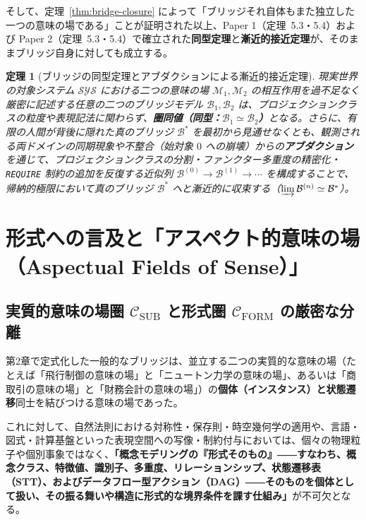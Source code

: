 \documentclass[11pt,a4paper]{ltjsarticle}
\theoremstyle{definition}
\theoremstyle{plain}
\newtheorem{theorem}{定理}[section]
\theoremstyle{remark}
\newcommand{\CFORM}{\mathcal{C}_{\mathrm{FORM}}}
\newcommand{\CSUB}{\mathcal{C}_{\mathrm{SUB}}}
\begin{document}
そして、定理~\ref{thm:bridge-closure} によって「ブリッジそれ自体もまた独立した一つの意味の場である」ことが証明された以上、Paper 1（定理~5.3・5.4）および Paper 2（定理~5.3・5.4）で確立された\textbf{同型定理}と\textbf{漸近的接近定理}が、そのままブリッジ自身に対しても成立する。

\begin{theorem}[ブリッジの同型定理とアブダクションによる漸近的接近定理]\label{thm:bridge-iso-asymp}
現実世界の対象システム $\mathcal{SYS}$ における二つの意味の場 $\mathcal{M}_1, \mathcal{M}_2$ の相互作用を過不足なく厳密に記述する任意の二つのブリッジモデル $\mathcal{B}_1, \mathcal{B}_2$ は、プロジェクションクラスの粒度や表現記法に関わらず、\textbf{圏同値（同型：$\mathcal{B}_1 \simeq \mathcal{B}_2$）}となる。さらに、有限の人間が背後に隠れた真のブリッジ $\mathcal{B}^*$ を最初から見通せなくとも、観測される両ドメインの同期現象や不整合（始対象 $0$ への崩壊）からの\textbf{アブダクション}を通じて、プロジェクションクラスの分割・ファンクター多重度の精密化・\texttt{REQUIRE} 制約の追加を反復する近似列 $\mathcal{B}^{(0)} \to \mathcal{B}^{(1)} \to \cdots$ を構成することで、帰納的極限において真のブリッジ $\mathcal{B}^*$ へと漸近的に収束する（$\varinjlim \mathcal{B}^{(n)} \simeq \mathcal{B}^*$）。
\end{theorem}
\section{形式への言及と「アスペクト的意味の場（Aspectual Fields of Sense）」}

\subsection{実質的意味の場圏 $\CSUB$ と形式圏 $\CFORM$ の厳密な分離}
第2章で定式化した一般的なブリッジは、並立する二つの実質的な意味の場（たとえば「飛行制御の意味の場」と「ニュートン力学の意味の場」、あるいは「商取引の意味の場」と「財務会計の意味の場」）の\textbf{個体（インスタンス）と状態遷移}同士を結びつける意味の場であった。

これに対して、自然法則における対称性・保存則・時空幾何学の適用や、言語・図式・計算基盤といった表現空間への写像・制約付与においては、個々の物理粒子や個別事象ではなく、\textbf{「概念モデリングの『形式そのもの』――すなわち、概念クラス、特徴値、識別子、多重度、リレーションシップ、状態遷移表（STT）、およびデータフロー型アクション（DAG）――そのものを個体として扱い、その振る舞いや構造に形式的な境界条件を課す仕組み」}が不可欠となる。
\end{document}
